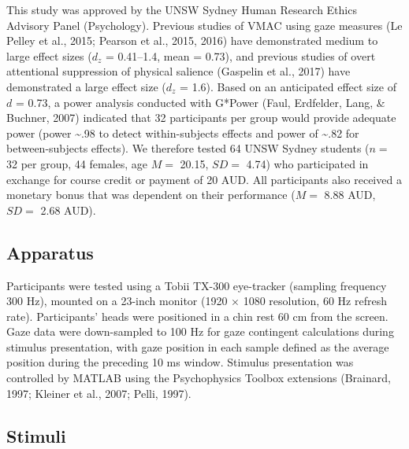 \documentclass[man, a4paper, noextraspace, 11pt,floatsintext]{apa6}
\begin{document}
This study was approved by the UNSW Sydney Human Research Ethics
Advisory Panel (Psychology). Previous studies of VMAC using gaze
measures (Le Pelley et al., 2015; Pearson et al., 2015, 2016) have
demonstrated medium to large effect sizes (\(d_z\) = 0.41--1.4, mean =
0.73), and previous studies of overt attentional suppression of physical
salience (Gaspelin et al., 2017) have demonstrated a large effect size
(\(d_z\) = 1.6). Based on an anticipated effect size of \(d\) = 0.73, a
power analysis conducted with G*Power (Faul, Erdfelder, Lang, \&
Buchner, 2007) indicated that 32 participants per group would provide
adequate power (power \textasciitilde{}.98 to detect within-subjects
effects and power of \textasciitilde{}.82 for between-subjects effects).
We therefore tested 64 UNSW Sydney students (\(n =\) 32 per group, 44
females, age \(M=\) 20.15, \(SD=\) 4.74) who participated in exchange
for course credit or payment of 20 AUD. All participants also received a
monetary bonus that was dependent on their performance (\(M =\) 8.88
AUD, \(SD =\) 2.68 AUD).

\subsection{Apparatus}\label{apparatus}

Participants were tested using a Tobii TX-300 eye-tracker (sampling
frequency 300 Hz), mounted on a 23-inch monitor (1920 \(\times\) 1080
resolution, 60 Hz refresh rate). Participants' heads were positioned in
a chin rest 60 cm from the screen. Gaze data were down-sampled to 100 Hz
for gaze contingent calculations during stimulus presentation, with gaze
position in each sample defined as the average position during the
preceding 10 ms window. Stimulus presentation was controlled by MATLAB
using the Psychophysics Toolbox extensions (Brainard, 1997; Kleiner et
al., 2007; Pelli, 1997).

\subsection{Stimuli}\label{stimuli}
\end{document}
